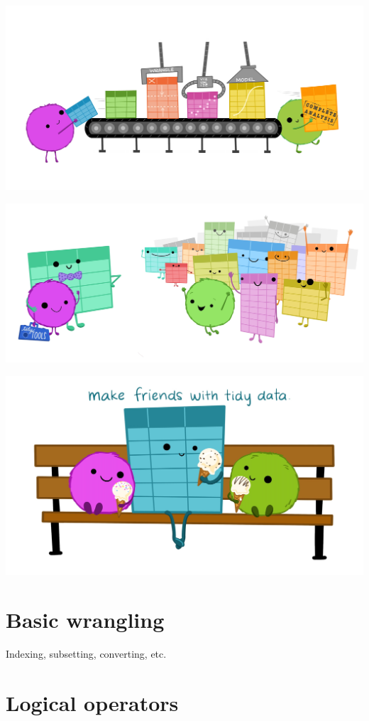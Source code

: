\documentclass[
]{book}
\begin{document}
\includegraphics{images/tidydata_5.jpg}

\includegraphics{images/tidydata_6.jpg}

\includegraphics{images/tidydata_7.jpg}

\hypertarget{basic-wrangling}{%
\chapter{Basic wrangling}\label{basic-wrangling}}

Indexing, subsetting, converting, etc.

\hypertarget{logicals}{%
\chapter{Logical operators}\label{logicals}}
\end{document}
